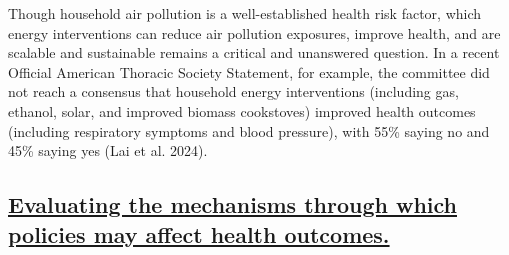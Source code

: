 \documentclass[
  letterpaper,
  DIV=11,
  numbers=noendperiod]{scrartcl}
\providecommand{\DIFadd}[1]{{\protect\color{blue}\underline{#1}}} %
\providecommand{\DIFaddbegin}{} %
\providecommand{\DIFaddend}{} %
\providecommand{\DIFdelbegin}{} %
\providecommand{\DIFdelend}{} %
\newcommand{\DIFscaledelfig}{0.5}
\newlength{\DIFdelgraphicswidth} %
\newlength{\DIFdelgraphicsheight} %
\newcommand{\DIFaddincludegraphics}[2][]{{\color{blue}\fbox{\DIFOincludegraphics[#1]{#2}}}} %
\newcommand{\DIFdelincludegraphics}[2][]{%
\sbox{\DIFdelgraphicsbox}{\DIFOincludegraphics[#1]{#2}}%
\settoboxwidth{\DIFdelgraphicswidth}{\DIFdelgraphicsbox} %
\settoboxtotalheight{\DIFdelgraphicsheight}{\DIFdelgraphicsbox} %
\scalebox{\DIFscaledelfig}{%
\parbox[b]{\DIFdelgraphicswidth}{\usebox{\DIFdelgraphicsbox}\\[-\baselineskip] \rule{\DIFdelgraphicswidth}{0em}}\llap{\resizebox{\DIFdelgraphicswidth}{\DIFdelgraphicsheight}{%
\setlength{\unitlength}{\DIFdelgraphicswidth}%
\begin{picture}(1,1)%
\thicklines\linethickness{2pt} %
{\color[rgb]{1,0,0}\put(0,0){\framebox(1,1){}}}%
{\color[rgb]{1,0,0}\put(0,0){\line( 1,1){1}}}%
{\color[rgb]{1,0,0}\put(0,1){\line(1,-1){1}}}%
\end{picture}%
}\hspace*{3pt}}} %
} %
\DeclareRobustCommand{\DIFaddbegin}{\DIFOaddbegin \let\includegraphics\DIFaddincludegraphics} %
\DeclareRobustCommand{\DIFaddend}{\DIFOaddend \let\includegraphics\DIFOincludegraphics} %
\DeclareRobustCommand{\DIFdelbegin}{\DIFOdelbegin \let\includegraphics\DIFdelincludegraphics} %
\DeclareRobustCommand{\DIFdelend}{\DIFOaddend \let\includegraphics\DIFOincludegraphics} %
\begin{document}
Though household air pollution is a well-established health risk factor,
which energy interventions can reduce air pollution exposures, improve
health, and are scalable and sustainable remains a critical and
unanswered question. In a recent Official American Thoracic Society
Statement, for example, the committee did not reach a consensus that
household energy interventions (including gas, ethanol, solar, and
improved biomass cookstoves) improved health outcomes (including
respiratory symptoms and blood pressure), with 55\% saying no and 45\%
saying yes (Lai et al. 2024).

\DIFdelbegin %
\DIFdelend \DIFaddbegin \subsection{\DIFadd{Evaluating the mechanisms through which policies may affect
health
outcomes.}}\label{evaluating-the-mechanisms-through-which-policies-may-affect-health-outcomes.}
\DIFaddend 
\end{document}
